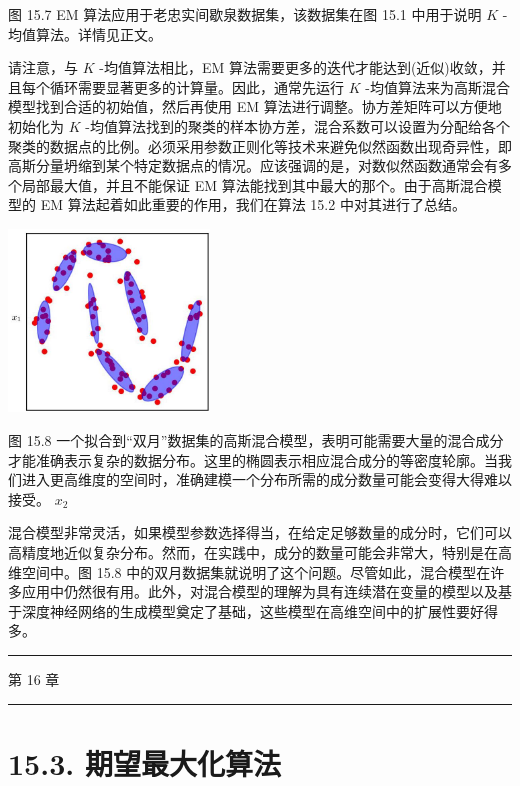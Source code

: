 \documentclass[10pt]{article}
\newcommand{\HRule}{\begin{center}\rule{0.9\linewidth}{0.2mm}\end{center}}
\begin{document}
图 15.7 EM 算法应用于老忠实间歇泉数据集，该数据集在图 15.1 中用于说明 \(K\) -均值算法。详情见正文。

请注意，与 \(K\) -均值算法相比，EM 算法需要更多的迭代才能达到(近似)收敛，并且每个循环需要显著更多的计算量。因此，通常先运行 \(K\) -均值算法来为高斯混合模型找到合适的初始值，然后再使用 EM 算法进行调整。协方差矩阵可以方便地初始化为 \(K\) -均值算法找到的聚类的样本协方差，混合系数可以设置为分配给各个聚类的数据点的比例。必须采用参数正则化等技术来避免似然函数出现奇异性，即高斯分量坍缩到某个特定数据点的情况。应该强调的是，对数似然函数通常会有多个局部最大值，并且不能保证 EM 算法能找到其中最大的那个。由于高斯混合模型的 EM 算法起着如此重要的作用，我们在算法 15.2 中对其进行了总结。

\begin{center}
\includegraphics[max width=0.4\textwidth]{images/0194e279-9b28-703a-88f4-c3ac21e2010d_493_950_344_602_548_0.jpg}
\end{center}
\hspace*{3em} 

图 15.8 一个拟合到“双月”数据集的高斯混合模型，表明可能需要大量的混合成分才能准确表示复杂的数据分布。这里的椭圆表示相应混合成分的等密度轮廓。当我们进入更高维度的空间时，准确建模一个分布所需的成分数量可能会变得大得难以接受。 \({x}_{2}\)

混合模型非常灵活，如果模型参数选择得当，在给定足够数量的成分时，它们可以高精度地近似复杂分布。然而，在实践中，成分的数量可能会非常大，特别是在高维空间中。图 15.8 中的双月数据集就说明了这个问题。尽管如此，混合模型在许多应用中仍然很有用。此外，对混合模型的理解为具有连续潜在变量的模型以及基于深度神经网络的生成模型奠定了基础，这些模型在高维空间中的扩展性要好得多。

\HRule

第 16 章

\HRule

\section*{15.3. 期望最大化算法}
\end{document}
